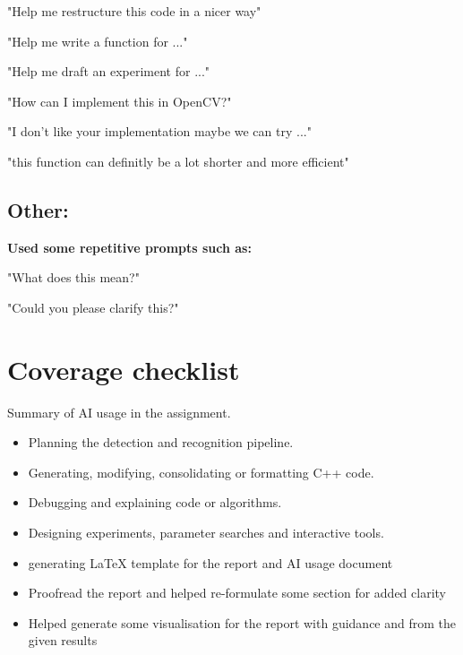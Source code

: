 \documentclass[12pt,a4paper]{article}
\newenvironment{aiprompt}{%
    \begin{list}{}{%
        \setlength{\leftmargin}{1em}%
        \setlength{\rightmargin}{1em}%
        \setlength{\topsep}{0.3em}%
        \setlength{\parsep}{0pt}%
    }%
    \item\relax
}{\end{list}}
\begin{document}
\begin{aiprompt}
"Help me restructure this code in a nicer way"
\end{aiprompt}

\begin{aiprompt}
"Help me write a function for ..."
\end{aiprompt}

\begin{aiprompt}
"Help me draft an experiment for ..."
\end{aiprompt}

\begin{aiprompt}
"How can I implement this in OpenCV?"
\end{aiprompt}

\begin{aiprompt}
"I don't like your implementation maybe we can try ..."
\end{aiprompt}

\begin{aiprompt}
"this function can definitly be a lot shorter and more efficient"
\end{aiprompt}

\subsection{Other:}

\textbf{Used some repetitive prompts such as:}

\begin{aiprompt}
"What does this mean?"
\end{aiprompt}

\begin{aiprompt}
"Could you please clarify this?"
\end{aiprompt}

\section{Coverage checklist}

Summary of AI usage in the assignment.

\begin{itemize}
    \item Planning the detection and recognition pipeline.
    \item Generating, modifying, consolidating or formatting C++ code.
    \item Debugging and explaining code or algorithms.
    \item Designing experiments, parameter searches and interactive tools.
    \item generating LaTeX template for the report and AI usage document
    \item Proofread the report and helped re-formulate some section for added clarity
    \item Helped generate some visualisation for the report with guidance and from the given results
\end{itemize}
\end{document}

